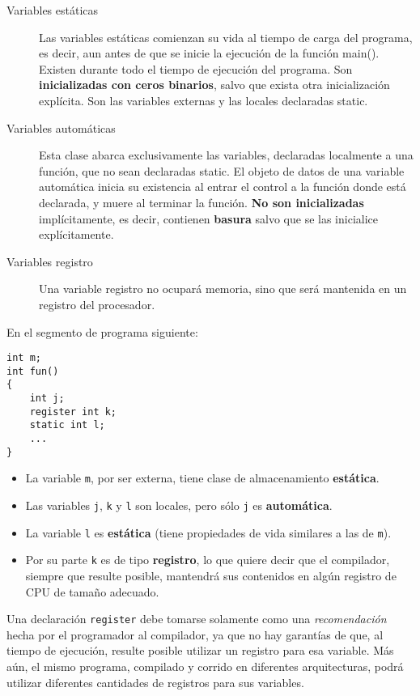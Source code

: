 \begin{description}
	\item[Variables estáticas] Las variables estáticas comienzan su vida al tiempo de carga del programa, es decir, aun antes de que
se inicie la ejecución de la función main(). Existen durante todo el tiempo de ejecución del programa.
Son \textbf{inicializadas con ceros binarios}, salvo que exista otra inicialización explícita. Son las variables
externas y las locales declaradas static.
 \item [Variables automáticas] Esta clase abarca exclusivamente las variables, declaradas localmente a una función, que no sean
declaradas static. El objeto de datos de una variable automática inicia su existencia al entrar el control a la función donde
está declarada, y muere al terminar la función. \textbf{No son inicializadas} implícitamente, es decir, contienen
\textbf{basura} salvo que se las inicialice explícitamente.
\item [Variables registro] Una variable registro no ocupará memoria, sino que será mantenida en un registro del procesador.
\end{description}

\begin{ejemplo}
En el segmento de programa siguiente:
\begin{lstlisting}
int m;
int fun()
{
	int j;
	register int k;
	static int l;
	...
}
\end{lstlisting}
\begin{itemize}
	\item La variable \texttt{m}, por ser externa, tiene clase de almacenamiento \textbf{estática}. 
	\item Las variables \texttt{j}, \texttt{k} y \texttt{l} son locales, pero sólo \texttt{j} es \textbf{automática}. 
	\item La variable \texttt{l} es \textbf{estática} (tiene propiedades de vida similares a las de \texttt{m}). 
		\item Por su parte \texttt{k} es de tipo \textbf{registro}, lo que quiere decir que el compilador, siempre que resulte posible, mantendrá sus contenidos en algún registro de CPU de tamaño adecuado. 
\end{itemize}
\end{ejemplo}


Una declaración \texttt{register} debe tomarse solamente como una \textit{recomendación} hecha por el programador al compilador, ya que no hay garantías de que, al tiempo de ejecución, resulte posible utilizar un registro para esa variable. Más aún, el mismo programa, compilado y corrido en diferentes arquitecturas, podrá utilizar diferentes cantidades de registros para sus variables.

